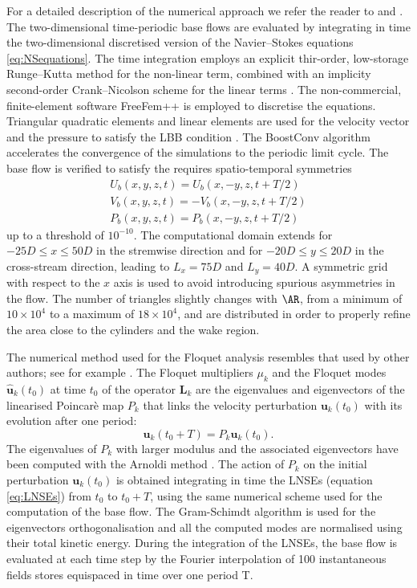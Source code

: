 \documentclass[onecolumn,notitlepage,superscriptaddress, amsmath,amssymb,longbibliographyaps,floatfix]{revtex4-1}
\begin{document}
For a detailed description of the numerical approach we refer the reader to \cite{chiarini-quadrio-auteri-2021b} and \cite{chiarini-quadrio-auteri-2021d}.
The two-dimensional time-periodic base flows are evaluated by integrating in time the two-dimensional discretised version of the Navier--Stokes equations \ref{eq:NSequations}. The time integration employs an explicit thir-order, low-storage Runge--Kutta method for the non-linear term, combined with an implicity second-order Crank--Nicolson scheme for the linear terms \cite{rai-moin-1991}. The non-commercial, finite-element software FreeFem++ \citep{hecht-2012} is employed to discretise the equations. Triangular quadratic elements and linear elements are used for the velocity vector and the pressure to satisfy the LBB condition \citep{brezzi-1974}. The BoostConv algorithm \citep{citro-etal-2017} accelerates the convergence of the simulations to the periodic limit cycle. The base flow is verified to satisfy the requires spatio-temporal symmetries 
\begin{equation}
\begin{gathered}
U_b(x,y,z,t) = U_b(x,-y,z,t+T/2) \\
V_b(x,y,z,t) = - V_b(x,-y,z,t+T/2) \\
P_b(x,y,z,t) = P_b(x,-y,z,t+T/2)
\end{gathered}
\end{equation}
up to a threshold of $10^{-10}$. The computational domain extends for $-25 D\le x \le 50 D$ in the stremwise direction and for $-20 D \le y \le 20 D $ in the cross-stream direction, leading to $L_x=75D$ and $L_y=40D$. A symmetric grid with respect to the $x$ axis is used to avoid introducing spurious asymmetries in the flow. The number of triangles slightly changes with $\AR$, from a minimum of $10 \times 10^4$ to a maximum of $18 \times 10^4$, and are distributed in order to properly refine the area close to the cylinders and the wake region.

The numerical method used for the Floquet analysis resembles that used by other authors; see for example \cite{barkley-henderson-1996}. The Floquet multipliers $\mu_k$ and the Floquet modes $\hat{\bm{u}}_k(t_0)$ at time $t_0$ of the operator $\bm{L}_k$ are the eigenvalues and eigenvectors of the linearised Poincarè map $P_k$ that links the velocity perturbation $\bm{u}_k(t_0)$ with its evolution after one period:
%
\begin{equation}
\bm{u}_k(t_0+T) = P_k \bm{u}_k(t_0).
\end{equation}
%
The eigenvalues of $P_k$ with larger modulus and the associated eigenvectors have been computed with the Arnoldi method \citep{saad-2011}. The action of $P_k$ on the initial perturbation $\bm{u}_k(t_0)$ is obtained integrating in time the LNSEs (equation \ref{eq:LNSEs}) from $t_0$ to $t_0+T$, using the same numerical scheme used for the computation of the base flow. The Gram-Schimdt algorithm is used for the eigenvectors orthogonalisation and all the computed modes are normalised using their total kinetic energy. During the integration of the LNSEs, the base flow is evaluated at each time step by the Fourier interpolation of 100 instantaneous fields stores equispaced in time over one period T.
\end{document}
